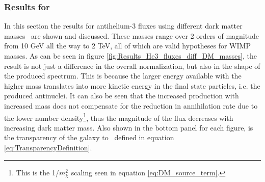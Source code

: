 \subsubsection{Results for \ahe\ }
In this section the results for antihelium-3 fluxes using different dark matter masses \dmm\ are shown and discussed. These masses range over 2 orders of magnitude from 10 GeV all the way to 2 TeV, all of which are valid hypotheses for WIMP masses. As can be seen in figure \ref{fig:Results_He3_fluxes_diff_DM_masses}, the result is not just a difference in the overall normalization, but also in the shape of the produced spectrum. This is because the larger energy available with the higher mass translates into more kinetic energy in the final state particles, i.e. the produced antinuclei. It can also be seen that the increased production with increased mass does not compensate for the reduction in annihilation rate due to the lower number density\footnote{This is the 1/$m_\chi^2$ scaling seen in equation \ref{eq:DM_source_term}.}, thus the magnitude of the flux decreases with increasing dark matter mass. Also shown in the bottom panel for each figure, is the transparency of the galaxy to \ahe\, defined in equation \ref{eq:TransparencyDefinition}. 

